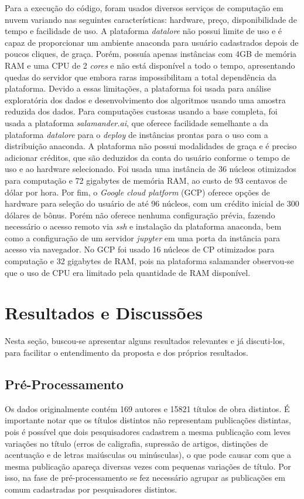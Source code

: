 \documentclass[12pt]{article}
\begin{document}
Para a execução do código, foram usados diversos serviços de computação em nuvem variando nas seguintes características: hardware, preço, disponibilidade de tempo e facilidade de uso. A plataforma \textit{datalore} não possui limite de uso e é capaz de proporcionar um ambiente anaconda para usuário cadastrados depois de poucos cliques, de graça. Porém, possuía apenas instâncias com 4GB de memória RAM e uma CPU de 2 \textit{cores} e não está disponível a todo o tempo, apresentando quedas do servidor que embora raras impossibilitam a total dependência da plataforma. Devido a essas limitações, a plataforma foi usada para análise exploratória dos dados e desenvolvimento dos algoritmos usando uma amostra reduzida dos dados. Para computações custosas usando a base completa, foi usada a plataforma \textit{salamander.ai}, que oferece facilidade semelhante a da plataforma \textit{datalore} para o \textit{deploy} de instâncias prontas para o uso com a distribuição anaconda. A plataforma não possui modalidades de graça e é preciso adicionar créditos, que são deduzidos da conta do usuário conforme o tempo de uso e ao hardware selecionado. Foi usada uma instância de 36 núcleos otimizados para computação e 72 gigabytes de memória RAM, ao custo de 93 centavos de dólar por hora. Por fim, o \textit{Google cloud platform} (GCP) oferece opções de hardware para seleção do usuário de até 96 núcleos, com um crédito inicial de 300 dólares de bônus. Porém não oferece nenhuma configuração prévia, fazendo necessário o acesso remoto via \textit{ssh} e instalação da plataforma anaconda, bem como a configuração de um servidor \textit{jupyter} em uma porta da instância para acesso via navegador. No GCP foi usado 16 núcleos de CP otimizados para computação e 32 gigabytes de RAM, pois na plataforma salamander observou-se que o uso de CPU era limitado pela quantidade de RAM disponível.

\section{Resultados e Discussões}
Nesta seção, buscou-se apresentar alguns resultados relevantes e já discuti-los, para facilitar o entendimento da proposta e dos próprios resultados.

\subsection{Pré-Processamento}

Os dados originalmente contém 169 autores e 15821 títulos de obra distintos. É importante notar que os títulos distintos não representam publicações distintas, pois é possível que dois pesquisadores cadastrem a mesma publicação com leves variações no título (erros de caligrafia, supressão de artigos, distinções de acentuação e de letras maiúsculas ou minúsculas), o que pode causar com que a mesma publicação apareça diversas vezes com pequenas variações de título. Por isso, na fase de pré-processamento se fez necessário agrupar as publicações em comum cadastradas por pesquisadores distintos.
\end{document}
